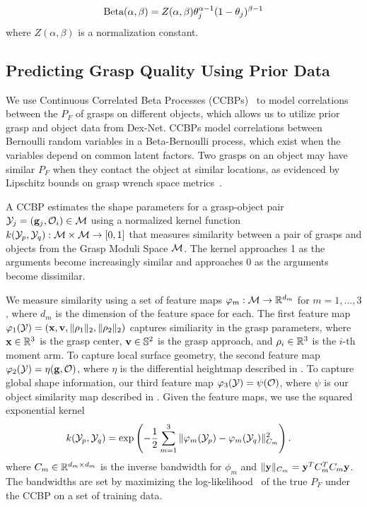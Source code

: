 \vspace{-4ex}
\begin{align*}
	\text{Beta}(\alpha, \beta) = Z(\alpha, \beta) \theta_j^{\alpha-1} (1 - \theta_j)^{\beta-1}
\end{align*}
\noindent where $Z(\alpha, \beta)$ is a normalization constant.

\subsection{Predicting Grasp Quality Using Prior Data}
We use Continuous Correlated Beta Processes (CCBPs)~\cite{goetschalckx2011continuous, montesano2012active} to model correlations between the $P_F$ of grasps on different objects, which allows us to utilize prior grasp and object data from Dex-Net.
CCBPs model correlations between Bernoulli random variables in a Beta-Bernoulli process, which exist when the variables depend on common latent factors.
Two grasps on an object may have similar $P_F$ when they contact the object at similar locations, as evidenced by Lipschitz bounds on grasp wrench space metrics~\cite{pokorny2013c}.

A CCBP estimates the shape parameters for a grasp-object pair $\mathcal{Y}_{j} = (\mathbf{g}_{j}, \mathcal{O}_{i}) \in \mathcal{M}$ using a normalized kernel function $k(\mathcal{Y}_p, \mathcal{Y}_q) : \mathcal{M} \times \mathcal{M} \rightarrow [0,1]$ that measures similarity between a pair of grasps and objects from the Grasp Moduli Space $\mathcal{M}$.
The kernel approaches 1 as the arguments become increasingly similar and approaches 0 as the arguments become dissimilar.

We measure similarity using a set of feature maps $\varphi_m: \mathcal{M} \rightarrow \mathbb{R}^{d_m}$ for $m = 1, ..., 3$, where $d_m$ is the dimension of the feature space for each.
The first feature map $\varphi_{1}(\mathcal{Y}) = (\mathbf{x}, \mathbf{v}, \| \rho_1 \|_2, \| \rho_2 \|_2)$ captures similiarity in the grasp parameters, where $\mathbf{x} \in \mathbb{R}^3$ is the grasp center, $\mathbf{v} \in \mathbb{S}^2$ is the grasp approach, and $\rho_i \in \mathbb{R}^3$ is the $i$-th moment arm.
To capture local surface geometry, the second feature map $\varphi_{2}(\mathcal{Y}) = \eta(\mathbf{g}, \mathcal{O})$, where $\eta$ is the differential heightmap described in .
To capture global shape information, our third feature map $\varphi_{3}(\mathcal{Y}) = \psi(\mathcal{O})$, where $\psi$ is our object similarity map described in .
Given the feature maps, we use the squared exponential kernel 
\begin{align*}
	k(\mathcal{Y}_p, \mathcal{Y}_q) &= \exp\left( - \frac{1}{2} \sum \limits_{m=1}^{3} \|\varphi_m(\mathcal{Y}_p) - \varphi_m(\mathcal{Y}_q)\|_{C_m}^2 \right).
\end{align*}
\noindent where $C_m \in \mathbb{R}^{d_m \times d_m}$ is the inverse bandwidth for $\phi_m$ and $\| \mathbf{y} \|_{C_m} = \mathbf{y}^T C_m^T C_m \mathbf{y}$.
The bandwidths are set by maximizing the log-likelihood~\cite{goetschalckx2011continuous} of the true $P_F$ under the CCBP on a set of training data.

